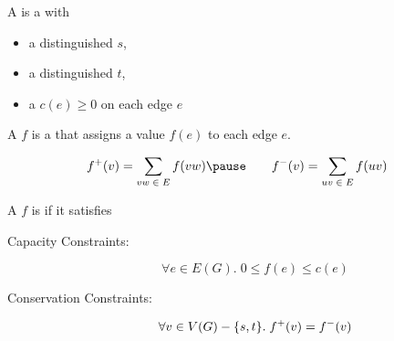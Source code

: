 
\begin{frame}{}
  \begin{definition}[Network (网络)]
    A  is a  with
    \begin{itemize}
      \setlength{\itemsep}{5pt}
      \item a distinguished  $s$,
      \item a distinguished  $t$,
      \item a  $c(e) \ge 0$ on each edge $e$
    \end{itemize}
  \end{definition}

\end{frame}

\begin{frame}{}
  \begin{definition}[Flow (流)]
    A  $f$ is a  that assigns a value $f(e)$ to each edge $e$.
  \end{definition}


  \pause
  \[
    f^{+}(v) = \sum_{vw \;\in\; E} f(vw)
    \pause \qquad
    f^{-}(v) = \sum_{uv \;\in\; E} f(uv)
  \]
\end{frame}

\begin{frame}{}
  \begin{definition}[Feasible]
    A  $f$ is  if it satisfies
    \begin{description}
      \item[Capacity Constraints:]
        \[
          \forall e \in E(G).\; 0 \le f(e) \le c(e)
        \]
      \item[Conservation Constraints:]
        \[
          \forall v \in V(G) - \{s, t\}.\; f^{+}(v) = f^{-}(v)
        \]
    \end{description}
  \end{definition}

\end{frame}

